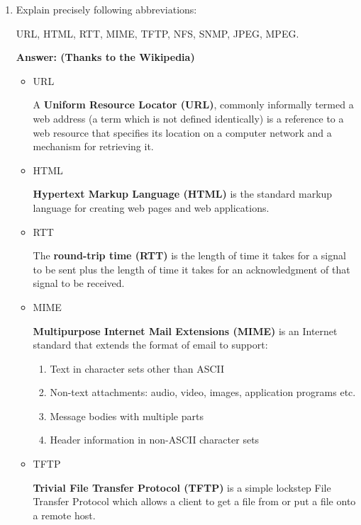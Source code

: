 \begin{enumerate}
    \item Explain precisely following abbreviations:
    
    URL, HTML, RTT, MIME, TFTP, NFS, SNMP, JPEG, MPEG.
    
    \textbf{Answer: (Thanks to the Wikipedia)}
    
    \begin{itemize}
        \item URL

        A \textbf{Uniform Resource Locator (URL)}, commonly informally termed a web address (a term which is not defined identically) is a reference to a web resource that specifies its location on a computer network and a mechanism for retrieving it.
        
        \item HTML
        
        \textbf{Hypertext Markup Language (HTML)} is the standard markup language for creating web pages and web applications.
        
        \item RTT
        
        The \textbf{round-trip time (RTT)} is the length of time it takes for a signal to be sent plus the length of time it takes for an acknowledgment of that signal to be received.
        
        \item MIME
        
        \textbf{Multipurpose Internet Mail Extensions (MIME)} is an Internet standard that extends the format of email to support:
        
        \begin{enumerate}
            \item Text in character sets other than ASCII
            \item Non-text attachments: audio, video, images, application programs etc.
            \item Message bodies with multiple parts
            \item Header information in non-ASCII character sets
        \end{enumerate}
        
        \item TFTP
        
        \textbf{Trivial File Transfer Protocol (TFTP)} is a simple lockstep File Transfer Protocol which allows a client to get a file from or put a file onto a remote host.
        

\end{itemize}
\end{enumerate}
